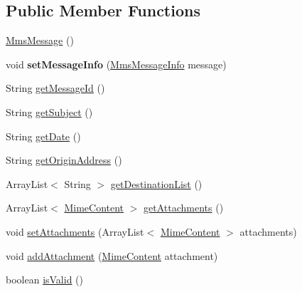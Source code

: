 \subsection*{Public Member Functions}
\begin{DoxyCompactItemize}
\item 
\hyperlink{classcom_1_1bluevia_1_1messagery_1_1mo_1_1mms_1_1data_1_1MmsMessage_a0492a5a0ab3c4c14bfc910b54ea4c5e5}{MmsMessage} ()
\item 
\hypertarget{classcom_1_1bluevia_1_1messagery_1_1mo_1_1mms_1_1data_1_1MmsMessage_a991a671324233c7377f8435648fabd7b}{
void {\bfseries setMessageInfo} (\hyperlink{classcom_1_1bluevia_1_1messagery_1_1mo_1_1mms_1_1data_1_1MmsMessageInfo}{MmsMessageInfo} message)}
\label{classcom_1_1bluevia_1_1messagery_1_1mo_1_1mms_1_1data_1_1MmsMessage_a991a671324233c7377f8435648fabd7b}

\item 
String \hyperlink{classcom_1_1bluevia_1_1messagery_1_1mo_1_1mms_1_1data_1_1MmsMessage_afa86a7b57d8d635d900eef811ff97758}{getMessageId} ()
\item 
String \hyperlink{classcom_1_1bluevia_1_1messagery_1_1mo_1_1mms_1_1data_1_1MmsMessage_a8b52ce649676ee03939c91ca40ea999e}{getSubject} ()
\item 
String \hyperlink{classcom_1_1bluevia_1_1messagery_1_1mo_1_1mms_1_1data_1_1MmsMessage_a1e8d34a02d0423efdd1fae931f1b2094}{getDate} ()
\item 
String \hyperlink{classcom_1_1bluevia_1_1messagery_1_1mo_1_1mms_1_1data_1_1MmsMessage_a88c0f3d97d7e6736b88254971e7fcee5}{getOriginAddress} ()
\item 
ArrayList$<$ String $>$ \hyperlink{classcom_1_1bluevia_1_1messagery_1_1mo_1_1mms_1_1data_1_1MmsMessage_a98d21f1d354494317f35e3bfe1c9f6a5}{getDestinationList} ()
\item 
ArrayList$<$ \hyperlink{classcom_1_1bluevia_1_1messagery_1_1mo_1_1mms_1_1data_1_1MimeContent}{MimeContent} $>$ \hyperlink{classcom_1_1bluevia_1_1messagery_1_1mo_1_1mms_1_1data_1_1MmsMessage_af7a8b3b9a40745354e1df583409d0164}{getAttachments} ()
\item 
void \hyperlink{classcom_1_1bluevia_1_1messagery_1_1mo_1_1mms_1_1data_1_1MmsMessage_a56d656a96106d8a49d2e5452e08f3a37}{setAttachments} (ArrayList$<$ \hyperlink{classcom_1_1bluevia_1_1messagery_1_1mo_1_1mms_1_1data_1_1MimeContent}{MimeContent} $>$ attachments)
\item 
void \hyperlink{classcom_1_1bluevia_1_1messagery_1_1mo_1_1mms_1_1data_1_1MmsMessage_ab8beb45dd2e80463df4d8341a2326548}{addAttachment} (\hyperlink{classcom_1_1bluevia_1_1messagery_1_1mo_1_1mms_1_1data_1_1MimeContent}{MimeContent} attachment)
\item 
boolean \hyperlink{classcom_1_1bluevia_1_1messagery_1_1mo_1_1mms_1_1data_1_1MmsMessage_a34ab8b22a04b8a255f6163c55f570add}{isValid} ()
\end{DoxyCompactItemize}


